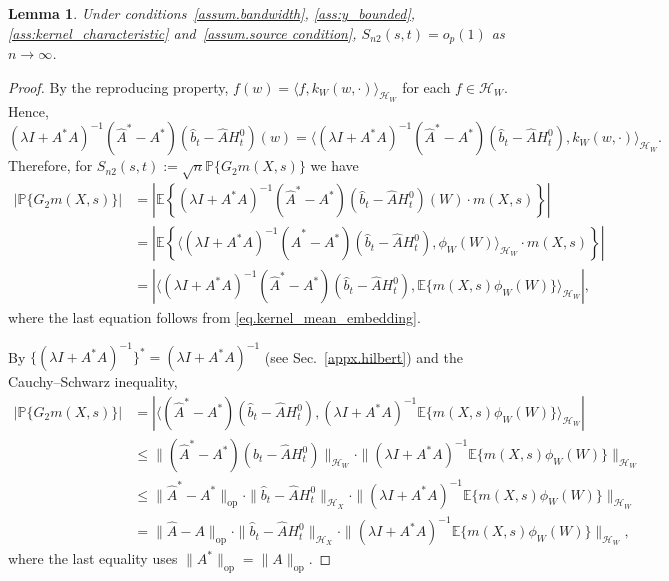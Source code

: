 \documentclass[
  12pt]{article}
\newtheorem{lemma}{Lemma}
\def\to{\rightarrow}
\begin{document}
\begin{lemma}
\label{lemma:Tn2}
Under conditions~\ref{assum.bandwidth}, \ref{ass:y_bounded}, \ref{ass:kernel_characteristic} and~\ref{assum.source condition}, $S_{n2}(s,t)=o_{p}(1)$ as $n\to\infty$. 
\end{lemma}
\begin{proof}
By the reproducing property, $f(w) = \langle f,k_W(w,\cdot)\rangle_{\mathcal{H}_{W}}$ for each $f\in \mathcal{H}_W$. Hence,
$$
(\lambda I+A^*A)^{-1}(\widehat{A}^*-A^*)(\widehat{b}_t-\widehat{A}H^0_t)(w)
= \langle( \lambda I+A^*A )^{-1}(\widehat{A}^*-A^*)(\widehat{b}_t-\widehat{A}H^0_t),k_W(w,\cdot)\rangle_{\mathcal{H}_{W}}.
$$
Therefore, for $S_{n2}(s,t):=\sqrt{n}  \mathbb{P}\{ G_2m(X,s)\}$ we have
\begin{align*}
	| \mathbb{P}\{ G_2m(X,s) \}|
	&= \left| \mathbb{E} \left\{ ( \lambda I+A^*A )^{-1}(\widehat{A}^*-A^*)(\widehat{b}_t-\widehat{A}H^0_t)(W)\cdot m(X,s) \right\} \right| \\
	&= \left| \mathbb{E} \left\{ \langle ( \lambda I+A^*A )^{-1}(\widehat{A}^*-A^*)(\widehat{b}_t-\widehat{A}H^0_t),\phi_W(W)\rangle_{\mathcal{H}_W}\cdot m(X,s) \right\} \right|  \\
	&=\left| \langle ( \lambda I+A^*A )^{-1}(\widehat{A}^*-A^*)(\widehat{b}_t-\widehat{A}H^0_t), \mathbb{E}\{ m(X,s)\phi_W(W)\} \rangle_{\mathcal{H}_W} \right| ,
\end{align*}
where the last equation follows from \eqref{eq.kernel_mean_embedding}.

By $\{( \lambda I+A^*A)^{-1}\}^*=( \lambda I+A^*A )^{-1}$ (see Sec.~\ref{appx.hilbert}) and the Cauchy--Schwarz inequality,
\begin{align*}
	\left| \mathbb{P}\{ G_2m(X,s) \}\right|
	&=\left| \langle (\widehat{A}^*-A^*)(\widehat{b}_t-\widehat{A}H^0_t), ( \lambda I+A^*A )^{-1} \mathbb{E}\{ m(X,s)\phi_W(W)\} \rangle_{\mathcal{H}_W} \right|\\
    &\le \|(\widehat{A}^*-A^*)(\widehat{b}_t-\widehat{A}H^0_t)\|_{\mathcal{H}_W}\cdot \|( \lambda I+A^*A )^{-1}\mathbb{E}\{m(X,s)\phi_W(W)\}\|_{\mathcal{H}_W} \\
	&\le \|\widehat{A}^*-A^*\|_{\mathrm{op}}\cdot \|\widehat{b}_t-\widehat{A}H^0_t\|_{\mathcal{H}_X}\cdot \|( \lambda I+A^*A )^{-1}\mathbb{E}\{m(X,s)\phi_W(W)\}\|_{\mathcal{H}_W} \\
	&= \|\widehat{A}-A\|_{\mathrm{op}}\cdot \|\widehat{b}_t-\widehat{A}H^0_t\|_{\mathcal{H}_X}\cdot \|( \lambda I+A^*A )^{-1}\mathbb{E}\{m(X,s)\phi_W(W)\}\|_{\mathcal{H}_W},
\end{align*}
where the last equality uses $\|A^*\|_{\mathrm{op}}=\|A\|_{\mathrm{op}}$.  


\end{proof}
\end{document}
